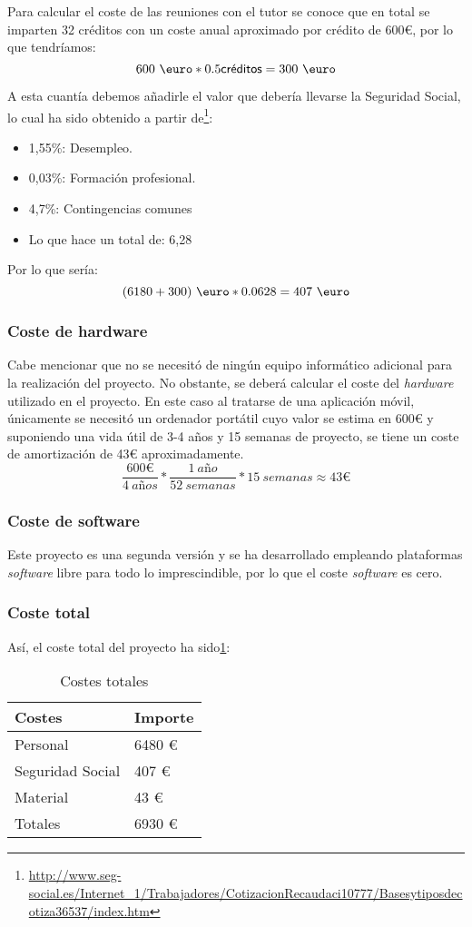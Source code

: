 Para calcular el coste de las reuniones con el tutor se conoce que en total se imparten 32 créditos  con un coste anual aproximado por crédito de 600\euro{}, por lo que tendríamos:
\[600~{\mbox{\euro}} * 0.5 \textsf{créditos}= 300 ~{\mbox{\euro}} \]

A esta cuantía debemos añadirle el valor que debería llevarse la Seguridad Social, lo cual ha sido obtenido a partir de\footnote{\url{http://www.seg-social.es/Internet_1/Trabajadores/CotizacionRecaudaci10777/Basesytiposdecotiza36537/index.htm}}:
\begin{itemize}
\item 1,55\%: Desempleo.
\item 0,03\%: Formación profesional.
\item 4,7\%: Contingencias comunes 
\item Lo que hace un total de: 6,28%
\end{itemize}
Por lo que sería:
\[(6180 + 300)~{\mbox{\euro}}*0.0628=407~{\mbox{\euro}}\]
\subsubsection{Coste de hardware}
Cabe mencionar que no se necesitó de ningún equipo informático adicional para la realización del proyecto. No obstante, se deberá calcular el coste del \textit{hardware} utilizado en el proyecto.
En este caso al tratarse de una aplicación móvil, únicamente se necesitó un ordenador portátil cuyo valor se estima en 600\euro{} y suponiendo una vida útil de 3-4 años y 15 semanas de proyecto, se tiene un coste de amortización de 43\euro{} aproximadamente.
\[ \frac{600\euro}{4 \ a\textit{ñ}os} * \frac{1 \ a\textit{ñ}o}{52 \ semanas} * 15 \ semanas \approx 43\euro \]

\subsubsection{Coste de software}
Este proyecto es una segunda versión y se ha desarrollado empleando plataformas \textit{software} libre para todo lo imprescindible, por lo que el coste \textit{software} es cero.
\subsubsection{Coste total}
Así, el coste total del proyecto ha sido\ref{tab:costes}:
\begin{table}[]
\centering
\caption{Costes totales}
\label{tab:costes}
\begin{tabular}{p{4cm} p{2cm}}
\toprule
Costes & Importe \\ \midrule
Personal         & 6480 \euro{}   \\ 
Seguridad Social & 407 \euro{} \\ 
Material         & 43 \euro{}   \\ 
Totales          & 6930 \euro{} \\ \bottomrule
\end{tabular}
\end{table}
